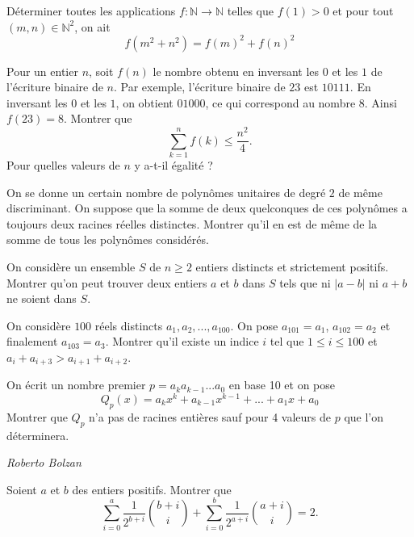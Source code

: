 \begin{exo}{}
Déterminer toutes les applications $f : \mathbb{N} \rightarrow \mathbb{N}$ telles que $f(1)>0$ et pour tout $(m,n) \in \mathbb{N}^{2}$, on ait
\[f(m^2+n^2) = f(m)^2+f(n)^2\]
\end{exo}

\begin{exo}{}
Pour un entier $n$, soit $f(n)$ le nombre obtenu en inversant les $0$ et les $1$ de l'écriture binaire de $n$. Par exemple, l'écriture binaire de $23$ est $10111$. En inversant les $0$ et les $1$, on obtient $01000$, ce qui correspond au nombre $8$. Ainsi $f(23)=8$. Montrer que
\[\sum_{k=1}^n f(k) \leq \frac{n^2}{4}.\]
Pour quelles valeurs de $n$ y a-t-il égalité ?
\end{exo}


\begin{exo}{}
On se donne un certain nombre de polynômes unitaires de degré $2$ de même discriminant. On suppose que la somme de deux quelconques de ces polynômes a toujours deux racines réelles distinctes. Montrer qu'il en est de même de la somme de tous les polynômes considérés.
\end{exo}


\begin{exo}{}
On considère un ensemble $S$ de $n\ge 2$ entiers distincts et strictement positifs. Montrer qu'on peut trouver deux entiers $a$ et $b$ dans $S$ tels que ni $|a-b|$ ni $a+b$ ne soient dans $S$.
 \end{exo}

\begin{exo}{}
On considère $100$ réels distincts $a_1,a_2,...,a_{100}$. On pose $a_{101}=a_1$, $a_{102}=a_2$ et finalement $a_{103}=a_3$. Montrer qu'il existe un indice $i$ tel que $1\le i \le 100$ et  $a_{i}+a_{i+3}>a_{i+1}+a_{i+2}$.
\end{exo}
\begin{exo}{}
On écrit un nombre premier $p=a_ka_{k-1}...a_0$ en base 10 et on pose
\[Q_p(x)=a_kx^k+a_{k-1}x^{k-1}+...+a_1x+a_0\]
Montrer que $Q_p$ n'a pas de racines entières sauf pour 4 valeurs de $p$ que l'on déterminera.

\medskip
\textit{Roberto Bolzan}
\end{exo}

%
\begin{exo}{}
Soient $a$ et $b$ des entiers positifs. Montrer que
$$\displaystyle \sum_{i=0}^{a} \frac{1}{2^{b+i}} \binom{b+i}{i} + \displaystyle\sum_{i=0}^{b} \frac{1}{2^{a+i}} \binom{a+i}{i} = 2.$$
\end{exo}


